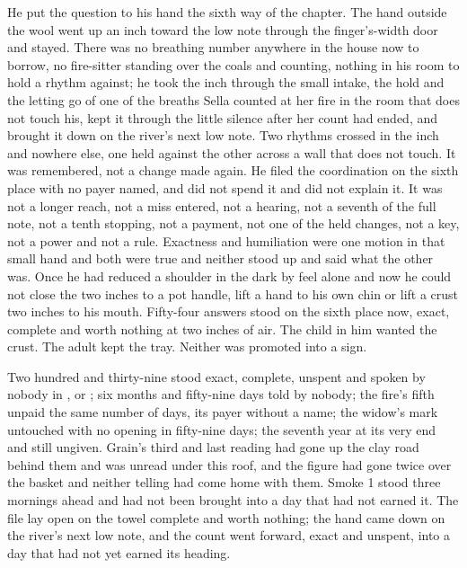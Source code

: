 He put the question to his hand the sixth way of the chapter. The hand outside the wool went up an inch toward the low note through the finger's-width door and stayed. There was no breathing number anywhere in the house now to borrow, no fire-sitter standing over the coals and counting, nothing in his room to hold a rhythm against; he took the inch through the small intake, the hold and the letting go of one of the breaths Sella counted at her fire in the room that does not touch his, kept it through the little silence after her count had ended, and brought it down on the river's next low note. Two rhythms crossed in the inch and nowhere else, one held against the other across a wall that does not touch. It was remembered, not a change made again. He filed the coordination on the sixth place with no payer named, and did not spend it and did not explain it. It was not a longer reach, not a miss entered, not a hearing, not a seventh of the full note, not a tenth stopping, not a payment, not one of the held changes, not a key, not a power and not a rule. Exactness and humiliation were one motion in that small hand and both were true and neither stood up and said what the other was. Once he had reduced a shoulder in the dark by feel alone and now he could not close the two inches to a pot handle, lift a hand to his own chin or lift a crust two inches to his mouth. Fifty-four answers stood on the sixth place now, exact, complete and worth nothing at two inches of air. The child in him wanted the crust. The adult kept the tray. Neither was promoted into a sign.

Two hundred and thirty-nine stood exact, complete, unspent and spoken by nobody in ,  or ; six months and fifty-nine days told by nobody; the fire's fifth unpaid the same number of days, its payer without a name; the widow's mark untouched with no opening in fifty-nine days; the seventh year at its very end and still ungiven. Grain's third and last reading had gone up the clay road behind them and was unread under this roof, and the figure had gone twice over the basket and neither telling had come home with them. Smoke 1 stood three mornings ahead and had not been brought into a day that had not earned it. The file lay open on the towel complete and worth nothing; the hand came down on the river's next low note, and the count went forward, exact and unspent, into a day that had not yet earned its heading.
